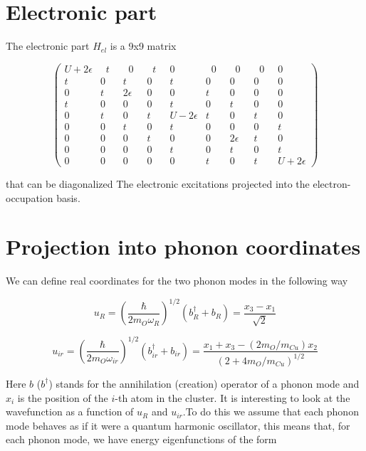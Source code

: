 \section{Electronic part}

The electronic part $H_{el}$ is a 9x9 matrix

\begin{equation}\label{eq:electronic-matrix}
\left( \begin{array}{ccccccccc} 
U+2\epsilon &\;\;t\;\;&\;\;0\;\;&\;\;t\;\;&0&\;\;0\;\;&\;\;0\;\;&\;\;0\;\;&0 \\
t&0&t&0&t&0&0&0&0 \\
0&t&2\epsilon &0&0&t&0&0&0 \\
t&0&0&0&t&0&t&0&0 \\
0&t&0&t&U-2\epsilon &t&0&t&0 \\
0&0&t&0&t&0&0&0&t \\
0&0&0&t&0&0&2\epsilon &t&0 \\
0&0&0&0&t&0&t&0&t \\
0&0&0&0&0&t&0&t&U+2\epsilon  \end{array} \right)\end{equation}

that can be diagonalized The electronic excitations projected into the electron-occupation basis.


\section{Projection into phonon coordinates}

We can define real coordinates for the two phonon modes in the following way\cite{MustredeLeon1992}

\begin{equation}\label{eq:uR}
u_R = \left(\frac{\hbar}{2 m_O \omega_R}\right)^{1/2}(b_R^\dagger + b_R) = \frac{x_3 - x_1}{\sqrt{2}}
\end{equation}

\begin{equation}\label{uir}
u_{ir} = \left(\frac{\hbar}{2 m_O \omega_{ir}}\right)^{1/2}(b^\dagger_{ir}+b_{ir}) = \frac{ x_1 + x_3 - ( 2 m_O/m_{Cu})x_2}{(2 + 4 m_O/m_{Cu})^{1/2}}
\end{equation}

Here $b$ ($b^\dagger$) stands for the annihilation (creation) operator of a phonon mode and $x_i$ is the position of the $i$-th atom in the cluster. It is interesting to look at the wavefunction as a function of $u_R$ and $u_{ir}$.To do this we assume that each phonon mode behaves as if it were a quantum harmonic oscillator, this means that, for each phonon mode, we have energy eigenfunctions of the form

